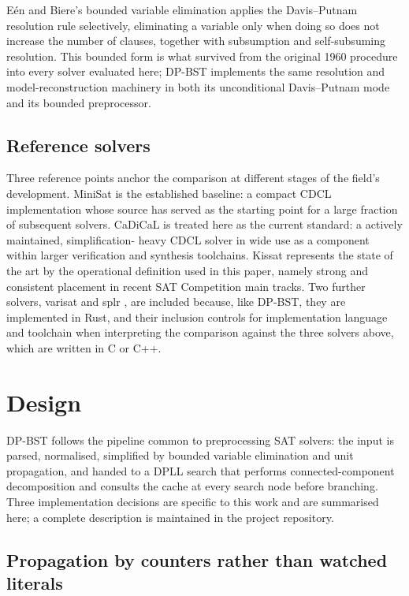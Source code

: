 \documentclass[conference]{IEEEtran}
\begin{document}
E{\'e}n and Biere's bounded variable elimination \cite{een2005} applies the Davis--Putnam
resolution rule selectively, eliminating a variable only when doing so does not increase the
number of clauses, together with subsumption and self-subsuming resolution. This bounded form is
what survived from the original 1960 procedure into every solver evaluated here; DP-BST implements
the same resolution and model-reconstruction machinery in both its unconditional Davis--Putnam
mode and its bounded preprocessor.

\subsection{Reference solvers}

Three reference points anchor the comparison at different stages of the field's development.
MiniSat \cite{een2003} is the established baseline: a compact CDCL implementation whose source
has served as the starting point for a large fraction of subsequent solvers. CaDiCaL
\cite{biere2019} is treated here as the current standard: a actively maintained, simplification-
heavy CDCL solver in wide use as a component within larger verification and synthesis toolchains.
Kissat \cite{biere2021} represents the state of the art by the operational definition used in
this paper, namely strong and consistent placement in recent SAT Competition main tracks. Two
further solvers, varisat \cite{varisat} and splr \cite{splr}, are included because, like DP-BST,
they are implemented in Rust, and their inclusion controls for implementation language and
toolchain when interpreting the comparison against the three solvers above, which are written in
C or C++.

\section{Design}

DP-BST follows the pipeline common to preprocessing SAT solvers: the input is parsed, normalised,
simplified by bounded variable elimination and unit propagation, and handed to a DPLL search that
performs connected-component decomposition and consults the cache at every search node before
branching. Three implementation decisions are specific to this work and are summarised here; a
complete description is maintained in the project repository.

\subsection{Propagation by counters rather than watched literals}
\end{document}
